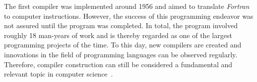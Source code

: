 The first compiler was implemented around 1956 and aimed to translate \emph{Fortran} to computer instructions.
However, the success of this programming endeavor was not assured until the program was completed.
In total, the program involved roughly 18 man-years of work
and is thereby regarded as one of the largest programming projects of the time.
To this day, new compilers are created and innovations in the field of programming languages can be observed regularly.
Therefore, compiler construction can still be considered a fundamental and relevant topic in computer science~\cite[p.~6]{wirth_compiler_construction_2005}.
